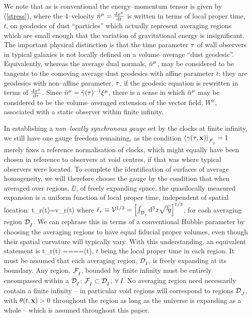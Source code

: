 \documentclass[12pt]{article}
\begin{document}
We note that as is conventional the energy--momentum tensor is given by
(\ref{stress}), where the 4--velocity $\bn^\mu=\Deriv{\dd}{\ts}{x^\mu}$ is
written in terms of local proper time, $t$, on geodesics of dust
``particles'' which actually represent averaging regions which are small
enough that the variation of gravitational energy is insignificant.
The important physical distinction is that the time parameter $\tau$ of wall
observers in typical galaxies is not locally defined on a volume--average
``dust geodesic''. Equivalently, whereas the average dual normals, $\bn^\mu$,
may be considered to be tangents to the comoving average
dust geodesics with affine parameter $t$; they are geodesics with
non--affine parameter, $\tau$, if the geodesic equation is rewritten in terms
of ${{\rm d} x^\mu\over{\rm d}\tau}$. Since $\bn^\mu=\gb(\tc)^{-1}\xi^\mu$, there
is a sense in which $\bn^\mu$ may be considered to be the volume--averaged
extension of the vector field, $W^\mu$, associated with a static observer
within finite infinity.

In establishing a {\em non--locally synchronous gauge} set by the clocks
at finite infinity, we still have one gauge freedom remaining, as
the condition $\ave{\ga(\tc,\bx)}\Z{\Fi}=1$ merely fixes a reference
normalisation of clocks, which might equally have been chosen in
reference to observers at void centres, if that was where typical observers
were located.
To complete the identification of surfaces of average homogeneity,
we will therefore choose the gauge by the condition that when averaged over
regions, $\DD$, of freely expanding space, the quasilocally measured expansion
is a uniform function of local proper time, independent of spatial location:
\beq
\Deriv\dd t{\ell_r(t)}=v_r(t)
\eeq
where $\ell_r\equiv\Vav^{1/3}=\left[\int_{\DD\X I}\dd^3x\sqrt{\gd}\right]
^{1/3}$, for each averaging region $\DD\Z I$.
We can rephrase this in terms of a conventional Hubble parameter by choosing
the averaging regions to have equal fiducial proper volumes, even though their
spatial curvature will typically vary. With this understanding, an
equivalent statement is
\Deriv\dd t{\ell_r(t)}
=\ave\th{}=\ave\th{}=\cdots=\bH(t),
\label{homo}\eeq
$t$ being the local proper time in each region. It must be assumed that
each averaging region, $\DD\Z I$, is freely expanding
at its boundary. Any region, $\FI$, bounded by finite infinity must be
entirely encompassed within a $\DD\Z I$: $\FI\subset\DD\Z I$, $\forall\,I$.
No averaging region need necessarily contain a finite infinity -- in
particular void regions will correspond to regions $\DD\Z J$, with
$\theta(t,{\mathbf x})>0$ throughout the region as long as the universe is expanding
as a whole -- which is assumed throughout this paper.
\end{document}
